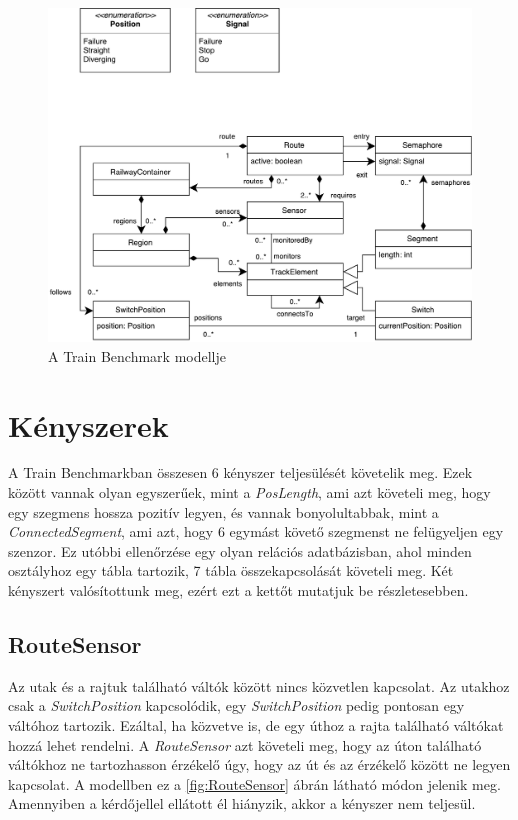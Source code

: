 \begin{figure}[H]
	\includegraphics[width=\linewidth, keepaspectratio]{figures/model.pdf}
	\caption{A Train Benchmark modellje}
	\label{fig:ModelDiagram}
\end{figure}

\section{Kényszerek}

A Train Benchmarkban összesen 6 kényszer teljesülését követelik meg. Ezek között vannak olyan egyszerűek, mint a \emph{PosLength}, ami azt követeli meg, hogy egy szegmens hossza pozitív legyen, és vannak bonyolultabbak, mint a \emph{ConnectedSegment}, ami azt, hogy 6 egymást követő szegmenst ne felügyeljen egy szenzor. Ez utóbbi ellenőrzése egy olyan relációs adatbázisban, ahol minden osztályhoz egy tábla tartozik, 7 tábla összekapcsolását követeli meg.
Két kényszert valósítottunk meg, ezért ezt a kettőt mutatjuk be részletesebben.

\subsection{RouteSensor}

Az utak és a rajtuk található váltók között nincs közvetlen kapcsolat. Az utakhoz csak a \emph{SwitchPosition} kapcsolódik, egy \emph{SwitchPosition} pedig pontosan egy váltóhoz tartozik. Ezáltal, ha közvetve is, de egy úthoz a rajta található váltókat hozzá lehet rendelni. A \emph{RouteSensor} azt követeli meg, hogy az úton található váltókhoz ne tartozhasson érzékelő úgy, hogy az út és az érzékelő között ne legyen kapcsolat. A modellben ez a \ref{fig:RouteSensor} ábrán látható módon jelenik meg. Amennyiben a kérdőjellel ellátott él hiányzik, akkor a kényszer nem teljesül.

